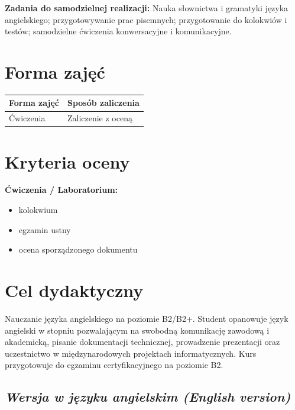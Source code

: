 \documentclass[12pt, a4paper]{article}
\newcommand{\thdrule}{\noalign{\global\setlength{\extrarowheight}{0pt}}}
\newcommand{\thdend}{\noalign{\global\setlength{\extrarowheight}{3pt}}}
\begin{document}
\vspace{4pt}
\noindent\textbf{Zadania do samodzielnej realizacji:} Nauka słownictwa i gramatyki języka angielskiego; przygotowywanie prac pisemnych; przygotowanie do kolokwiów i testów; samodzielne ćwiczenia konwersacyjne i komunikacyjne.

\section{Forma zajęć}

\begin{center}
{\scriptsize
\begin{tabular}{m{5cm}m{8cm}}
\thdrule\toprule
\rowcolor{pjatkRed} {\color{white}\textbf{Forma zajęć}} & {\color{white}\textbf{Sposób zaliczenia}} \\
\midrule\thdend
  \rowcolor{tableRowLight} Ćwiczenia & Zaliczenie z oceną \\
\bottomrule
\end{tabular}}
\end{center}

\section{Kryteria oceny}

\textbf{Ćwiczenia / Laboratorium:}
\begin{itemize}
  \item kolokwium
  \item egzamin ustny
  \item ocena sporządzonego dokumentu
\end{itemize}


\section{Cel dydaktyczny}

Nauczanie języka angielskiego na poziomie B2/B2+. Student opanowuje język angielski w stopniu pozwalającym na swobodną komunikację zawodową i akademicką, pisanie dokumentacji technicznej, prowadzenie prezentacji oraz uczestnictwo w międzynarodowych projektach informatycznych. Kurs przygotowuje do egzaminu certyfikacyjnego na poziomie B2.

\subsection*{\textit{Wersja w języku angielskim (English version)}}
\end{document}
